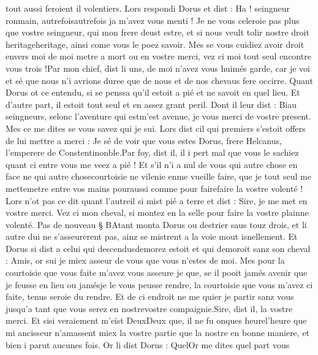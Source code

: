 \documentclass{article}
\begin{document}
\begin{pages}
   tout aussi feroient il volentiers. Lors respondi Dorus et dist :
   Ha ! seingneur ronmain, autrefoisautrefois ja 
      m’avez vous menti ! Je ne vous celeroie pas plus que vostre seingneur, qui mon frere deust 
      estre, et si nous veult tolir nostre droit heritageheritage, ainsi come vous le poez savoir. 
   Mes se vous cuidiez avoir droit envers moi de moi metre a mort ou en vostre merci, vez ci moi tout seul encontre vous trois !Par mon chief, dist li uns, de moi n’avez vous huimés garde, 
   car je voi et sé que nous n’i avrions duree que de nous et de nos chevaus fere occirre. \pend
\pstart Quant Dorus ot ce entendu, si se penssa 
   qu’il estoit a pié et ne savoit en quel lieu. Et d’autre part, il estoit tout seul 
   et en assez grant peril. Dont il leur dist :
   Biau seingneurs, selonc l’aventure qui estm'est 
      avenue, je vous merci de vostre present. 
   Mes ce me dites se vous savez qui je sui.
   Lors dist cil qui premiers s’estoit offers de lui mettre a merci :
   Je sé de voir que vous estes Dorus, frere 
      Helcanus, l’emperere de 
      Constentinonble.Par foy, dist il, il i pert mal que vous le sachiez quant ci entre vous me veez a pié ! 
      Et s’il n’i a nul de vous qui autre chose en face ne qui autre 
      chosecourtoisie ne vilenie 
      enme vueille faire, que je tout seul me 
      mettemetre 
      entre vos mains pouraussi comme pour 
      fairefaire la vostre volenté !
   Lors n’ot pas ce dit quant l’autreil si mist pié a terre et dist :
   Sire, je me met en vostre merci. Vez ci mon cheval, si montez en la selle pour faire 
      la vostre plainne volenté. \pend
\pstart Pas de nouveau § BAtant monta Dorus 
   ou destrier saus touz drois, 
   et li autre dui ne s’asseurerent pas, ainz se mistrent a la voie mout isnellement. Et Dorus si dist a 
   celui qui descendusdemorez estoit
      et qui demoroit sanz son cheval :
   Amis, or sui je miex asseur de vous que vous n’estes de moi. 
   Mes pour la courtoisie que vous faite m’avez vous asseure je que, se il pooit jamés avenir que je feusse en lieu ou 
      jamésje le vous 
      peusse rendre, la courtoisie que vous m’avez ci faite, tenus seroie du rendre. 
      Et de ci endroit ne me quier je partir sanz vous 
      jusqu’a tant que vous serez en nostrevostre compaignie.Sire, dist il, la vostre merci. Et 
      sisi veraiement m’eïst 
      DeuxDeux que, il ne fu onques 
      heurel'heure que mi ancisseur n’amassent miex 
      la vostre partie que la nostre en bonne maniere, et bien i parut aucunes fois.
   Or li dist Dorus :
   QuelOr me dites quel part vous 

\end{pages}
\end{document}
